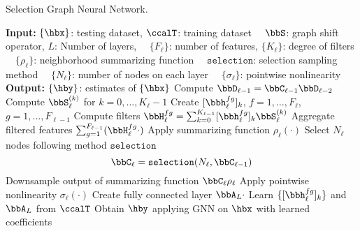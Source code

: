 \begin{algorithm}[t]
 	\caption{Selection Graph Neural Network.}
	\label{algm_selection_gnn}

	\begin{algorithmic}[1]
 \Statex \textbf{Input:} $\{\hbx\}$: testing dataset, $\ccalT$: training dataset
 \Statex $\quad \bbS$: graph shift operator, $L$: Number of layers, 
 \Statex $\quad \{F_{\ell}\}$: number of features, $\{K_{\ell}\}$: degree of filters
 \Statex $\quad \{\rho_{\ell}\}$: neighborhood summarizing function
 \Statex $\quad \texttt{selection}$: selection sampling method
 \Statex $\quad \{N_{\ell}\}$: number of nodes on each layer
 \Statex $\quad \{\sigma_{\ell}\}$: pointwise nonlinearity
 \Statex \textbf{Output:} $\{\hby\}$: estimates of $\{\hbx\}$
 \Statex
 {}
       \State Compute $\bbD_{\ell-1} = \bbC_{\ell-1} \bbD_{\ell-2}$ 
       \State Compute $\bbS_{\ell}^{(k)}$ for $k=0,\ldots,K_{\ell}-1$ 
       \State Create $[\bbh_{\ell}^{fg}]_{k}$, $f = 1,\ldots,F_{\ell}$, $g=1,\ldots,F_{\ell-1}$
       \State Compute filters $\bbH_{\ell}^{fg} = \sum_{k=0}^{K_{\ell-1}} [\bbh_{\ell}^{fg}]_{k} \bbS_{\ell}^{(k)}$
       \State Aggregate filtered features $\sum_{g=1}^{F_{\ell-1}} (\bbH_{\ell}^{fg} \cdot)$
       \State Apply summarizing function $\rho_{\ell}(\cdot)$
       \State Select $N_{\ell}$ nodes following method $\texttt{selection}$
       $$ \bbC_{\ell} = \texttt{selection}(N_{\ell},\bbC_{\ell-1}) $$
       \State Downsample output of summarizing function $\bbC_{\ell} \rho_{\ell}$
       \State Apply pointwise nonlinearity $\sigma_{\ell}(\cdot)$
   \EndFor
   \State Create fully connected layer $\bbA_{L} \cdot$
   \State Learn $\{[\bbh_{\ell}^{fg}]_{k}\}$ and $\bbA_{L}$ from $\ccalT$
   \State Obtain $\hby$ applying GNN on $\hbx$ with learned coefficients
 \EndProcedure
 	\end{algorithmic}

\end{algorithm}

